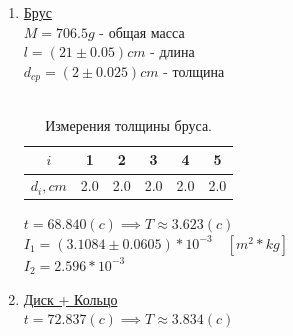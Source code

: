 \documentclass[12pt]{article}
\begin{document}
\begin{enumerate}
\begin{enumerate}
                \item \underline{Брус} \\
                    $M = 706.5 g$ - общая масса\\ 
                    $l = (21 \pm 0.05)cm$ - длина  \\
                    $d_{cp} = (2 \pm 0.025)cm$ - толщина\\ \\
                    \begin{table}[h]
                        \caption{Измерения толщины бруса.}
                        \begin{center}
                        \begin{tabular}{|c|c|c|c|c|c|}
                            \hline 
                                $i$ & 1 & 2 & 3 & 4 & 5 \\
                            \hline
                                $d_i,cm$ & 2.0 & 2.0 & 2.0 & 2.0 & 2.0 \\
                            \hline
                        \end{tabular}
                        \end{center}
                    \end{table}
                    
                    $t = 68.840(c) \implies T \approx 3.623(c)$ \\ 
                    $I_1 = (3.1084 \pm 0.0605) * 10^{-3} \quad [m^2 * kg]$ \\
                    $I_2 = 2.596 * 10 ^ {-3}$
                \item \underline{Диск + Кольцо} \\
                    $t = 72.837(c) \implies T \approx 3.834(c)$


\end{enumerate}
\end{enumerate}
\end{document}

